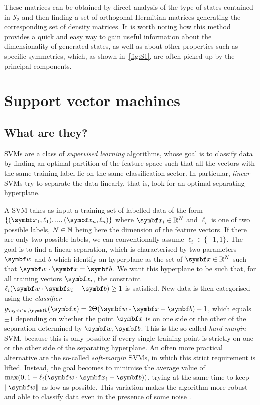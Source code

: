These matrices can be obtained by direct analysis of the type of states contained in $\mathcal S_2$ and then finding a set of orthogonal Hermitian matrices generating the corresponding set of density matrices.
It is worth noting how this method provides a quick and easy way to gain useful information about the dimensionality of generated states, as well as about other properties such as specific symmetries, which, as shown in~\cref{fig:S1}, are often picked up by the principal components.


\section{Support vector machines}
\label{sec:VVBs:SVMs}

\subsection{What are they?}

\acfp{SVM} are a class of \emph{supervised learning} algorithms, whose goal is to classify data by finding an optimal partition of the feature space such that all the vectors with the same training label lie on the same classification sector.
In particular, \emph{linear} \acp{SVM} try to separate the data linearly, that is, look for an optimal separating hyperplane.

A SVM takes as input a training set of labelled data of the form $\{(\bs x_1,\ell_1),...,(\bs x_n,\ell_n)\}$ where $\bs x_i\in\RR^N$ and $\ell_i$ is one of two possible labels, $N\in{\mathbb{N}}$ being here the dimension of the feature vectors. If there are only two possible labels, we can conventionally assume $\ell_i\in\{-1,1\}$.
The goal is to find a linear separation, which is characterised by two parameters $\bs w$ and $b$ which identify an hyperplane as the set of $\bs x\in\RR^N$ such that $\bs w\cdot\bs x=\bs b$. We want this hyperplane to be such that, for all training vectors $\bs x_i$, the constraint $\ell_i(\bs w\cdot\bs x_i-\bs b)\ge1$ is satisfied.
New data is then categorised using the \emph{classifier} $g_{\bs w,\bs b}(\bs x)=2\Theta(\bs w\cdot\bs x-\bs b)-1$, which equals $\pm1$ depending on whether the point $\bs x$ is on one side or the other of the separation determined by $\bs w,\bs b$.
This is the so-called \emph{hard-margin} SVM, because this is only possible if every single training point is strictly on one or the other side of the separating hyperplane.
An often more practical alternative are the so-called \emph{soft-margin} SVMs, in which this strict requirement is lifted. Instead, the goal becomes to minimise the average value of
$\max(0, 1- \ell_i (\bs w\cdot\bs x_i-\bs b))$, trying at the same time to keep $\|\bs w\|$ as low as possible. This variation makes the algorithm more robust and able to classify data even in the presence of some noise .



